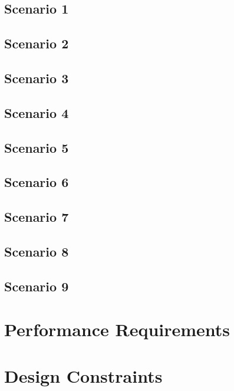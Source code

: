 \documentclass[numbers=noenddot, 12pt, a4paper, oneside]{scrbook}
\begin{document}
\subsection*{Scenario 1}



\subsection*{Scenario 2}



\subsection*{Scenario 3}


\subsection*{Scenario 4}



\subsection*{Scenario 5}



\subsection*{Scenario 6}


\subsection*{Scenario 7}


\subsection*{Scenario 8}


\subsection*{Scenario 9}


\section{Performance Requirements}

\section{Design Constraints}
\end{document}

